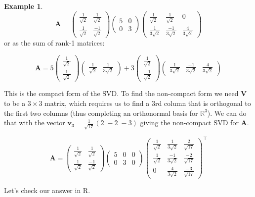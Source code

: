 \documentclass[]{book}
\theoremstyle{definition}
\theoremstyle{definition}
\newtheorem{example}{Example}[chapter]
\theoremstyle{definition}
\theoremstyle{remark}
\begin{document}
\begin{example}
\[\boldsymbol A= \left(\begin{array}{cc}\frac{1}{\sqrt{2}}&\frac{1}{\sqrt{2}}\\
               \frac{1}{\sqrt{2}}&\frac{-1}{\sqrt{2}}\end{array}\right) \left(\begin{array}{cc}5&0\\
               0&3\end{array}\right)\left(\begin{array}{ccc}\frac{1}{\sqrt{2}}&\frac{1}{\sqrt{2}}&0\\
                                             \frac{1}{3\sqrt{2}}& \frac{-1}{3 \sqrt{2}} &\frac{4}{3\sqrt{2}}\end{array}\right)\]
or as the sum of rank-1 matrices:

\[\boldsymbol A= 5\left(\begin{array}{c}\frac{1}{\sqrt{2}}\\
               \frac{1}{\sqrt{2}}\end{array}\right) \left(\begin{array}{cc}\frac{1}{\sqrt{2}}&\frac{1}{3\sqrt{2}}
                                                           \end{array}\right)+
   3\left(\begin{array}{c}\frac{1}{\sqrt{2}}\\
               \frac{-1}{\sqrt{2}}\end{array}\right) \left(\begin{array}{ccc}\frac{1}{3\sqrt{2}}& \frac{-1}{3 \sqrt{2}} &\frac{4}{3\sqrt{2}}\end{array}\right)\]

This is the compact form of the SVD. To find the non-compact form we need \(\boldsymbol V\) to be a \(3 \times 3\) matrix, which requires us to find a 3rd column that is orthogonal to the first two columns (thus completing an orthonormal basis for \(\mathbb{R}^3\)). We can do that with the vector \(\boldsymbol v_3 = \frac{1}{\sqrt{17}}(2\; -2\; -3)\) giving the non-compact SVD for \(\boldsymbol A\).

\[\boldsymbol A= \left(\begin{array}{cc}\frac{1}{\sqrt{2}}&\frac{1}{\sqrt{2}}\\
               \frac{1}{\sqrt{2}}&\frac{-1}{\sqrt{2}}\end{array}\right) \left(\begin{array}{ccc}5&0&0\\
               0&3&0\end{array}\right)\left(\begin{array}{ccc}\frac{1}{\sqrt{2}}& \frac{1}{3\sqrt{2}}&\frac{2}{\sqrt{17}} \\
                                             \frac{1}{\sqrt{2}}& \frac{-1}{3 \sqrt{2}} &\frac{-2}{\sqrt{17}}\\
                                             0&\frac{4}{3\sqrt{2}}&\frac{-3}{\sqrt{17}}\end{array}\right)^\top\]

Let's check our answer in R.
\end{example}
\end{document}
